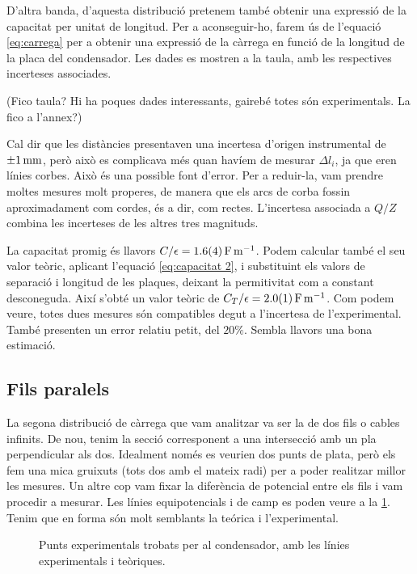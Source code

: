 D'altra banda, d'aquesta distribució pretenem també obtenir una expressió de la capacitat per unitat de longitud. Per a aconseguir-ho, farem ús de l'equació \cref{eq:carrega} per a obtenir una expressió de la càrrega en funció de la longitud de la placa del condensador. Les dades es mostren a la taula, amb les respectives incerteses associades. 

(Fico taula? Hi ha poques dades interessants, gairebé totes són experimentals. La fico a l'annex?)

Cal dir que les distàncies presentaven una incertesa d'origen instrumental de $ \data{}{1}{mm} $, però això es complicava més quan havíem de mesurar $\Delta l_i$, ja que eren línies corbes. Això és una possible font d'error. Per a reduir-la, vam prendre moltes mesures molt properes, de manera que els arcs de corba fossin aproximadament com cordes, és a dir, com rectes. L'incertesa associada a $Q/Z$ combina les incerteses de les altres tres magnituds.

La capacitat promig és llavors $C/\epsilon = \data{1.6}{0.4}{F.m^{-1}}$. Podem calcular també el seu valor teòric, aplicant l'equació \cref{eq:capacitat 2}, i substituint els valors de separació i longitud de les plaques, deixant la permitivitat com a constant desconeguda.
Així s'obté un valor teòric de $C_T/\epsilon = \data{2.0}{0.1}{F.m^{-1}} $. Com podem veure, totes dues mesures són compatibles degut a l'incertesa de l'experimental. També presenten un error relatiu petit, del $20\%$. Sembla llavors una bona estimació.

\subsection{Fils paralels}
La segona distribució de càrrega que vam analitzar va ser la de dos fils o cables infinits. De nou, tenim la secció corresponent a una intersecció amb un pla perpendicular als dos. Idealment només es veurien dos punts de plata, però els fem una mica gruixuts (tots dos amb el mateix radi) per a poder realitzar millor les mesures. Un altre cop vam fixar la diferència de potencial entre els fils i vam procedir a mesurar. Les línies equipotencials i de camp es poden veure a la \cref{fig:camp fils}. Tenim que en forma són molt semblants la teórica i l'experimental.

\begin{figure}[htb]
  \centering
  \caption{ Punts experimentals trobats per al condensador, amb les línies experimentals i teòriques.}
  \label{fig:camp fils}
\end{figure}

